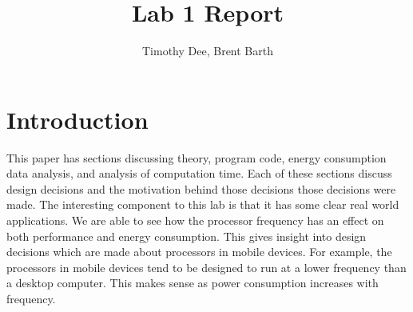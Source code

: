 \documentclass{article} %
\author{Timothy Dee, Brent Barth}
\title{Lab 1 Report}
\begin{document}
\twocolumn
\thispagestyle{empty}   %
\maketitle      %


%
%
%
%


\section{Introduction}
This paper has sections discussing theory, program code, energy consumption data analysis, and analysis of computation time. Each of these sections discuss design decisions and the motivation behind those decisions those decisions were made.
The interesting component to this lab is that it has some clear real world applications. We are able to see how the processor frequency has an effect on both performance and energy consumption. 
This gives insight into design decisions which are made about processors in mobile devices. For example, the processors in mobile devices tend to be designed to run at a lower frequency than a desktop computer. This makes sense as power consumption increases with frequency. 
\end{document}
